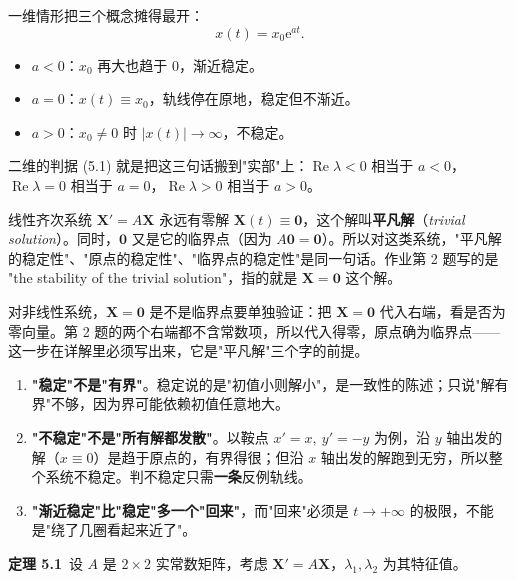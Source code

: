 \documentclass[11pt]{ctexart}
\newcommand{\X}{\mathbf{X}}\newcommand{\Y}{\mathbf{Y}}
\newcommand{\abs}[1]{\left|#1\right|}
\newcommand{\EN}[1]{\textcolor{inkgray}{\itshape #1}}
\begin{document}

一维情形把三个概念摊得最开：
\[
x(t)=x_0\mathrm{e}^{at}.
\]
\begin{itemize}
\item $a<0$：$x_0$ 再大也趋于 $0$，渐近稳定。
\item $a=0$：$x(t)\equiv x_0$，轨线停在原地，稳定但不渐近。
\item $a>0$：$x_0\neq0$ 时 $\abs{x(t)}\to\infty$，不稳定。
\end{itemize}
二维的判据 (5.1) 就是把这三句话搬到"实部"上：$\operatorname{Re}\lambda<0$ 相当于 $a<0$，$\operatorname{Re}\lambda=0$ 相当于 $a=0$，$\operatorname{Re}\lambda>0$ 相当于 $a>0$。


线性齐次系统 $\X'=A\X$ 永远有零解 $\X(t)\equiv\mathbf{0}$，这个解叫\textbf{平凡解}（\EN{trivial solution}）。同时，$\mathbf{0}$ 又是它的临界点（因为 $A\mathbf{0}=\mathbf{0}$）。所以对这类系统，"平凡解的稳定性"、"原点的稳定性"、"临界点的稳定性"是同一句话。作业第 2 题写的是 "the stability of the trivial solution"，指的就是 $\X=\mathbf{0}$ 这个解。

对非线性系统，$\X=\mathbf{0}$ 是不是临界点要单独验证：把 $\X=\mathbf{0}$ 代入右端，看是否为零向量。第 2 题的两个右端都不含常数项，所以代入得零，原点确为临界点——这一步在详解里必须写出来，它是"平凡解"三个字的前提。


\begin{enumerate}
\item \textbf{"稳定"不是"有界"}。稳定说的是"初值小则解小"，是一致性的陈述；只说"解有界"不够，因为界可能依赖初值任意地大。
\item \textbf{"不稳定"不是"所有解都发散"}。以鞍点 $x'=x,\ y'=-y$ 为例，沿 $y$ 轴出发的解（$x\equiv0$）是趋于原点的，有界得很；但沿 $x$ 轴出发的解跑到无穷，所以整个系统不稳定。判不稳定只需\textbf{一条}反例轨线。
\item \textbf{"渐近稳定"比"稳定"多一个"回来"}，而"回来"必须是 $t\to+\infty$ 的极限，不能是"绕了几圈看起来近了"。
\end{enumerate}



\textbf{定理 5.1}\ 设 $A$ 是 $2\times2$ 实常数矩阵，考虑 $\X'=A\X$，$\lambda_1,\lambda_2$ 为其特征值。
\end{document}
